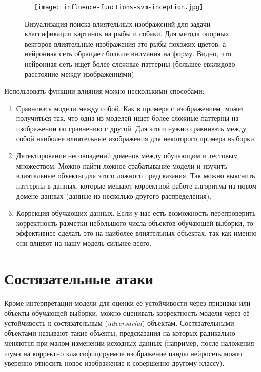 \documentclass[12pt,a4paper]{article}
\begin{document}
\begin{center}
\begin{figure}[!htb]
 \centering
 \texttt{[image: influence-functions-svm-inception.jpg]}
 \caption{Визуализация поиска влиятельных изображений для задачи классификации картинок на рыбы и собаки. Для метода опорных векторов влиятельные изображения это рыбы похожих цветов, а нейронная сеть обращает больше внимания на форму. Видно, что нейронная сеть ищет более сложные паттерны (большее евклидово расстояние между изображениями)}\label{fig:graph}
\end{figure}
\end{center}

Использовать функции влияния можно несколькими способами:
\begin{enumerate}
	\item Сравнивать модели между собой. Как в примере с изображением, может получиться так, что одна из моделей ищет более сложные паттерны на изображении по сравнению с другой. Для этого нужно сравнивать между собой наиболее влиятельные изображения для некоторого примера выборки.
	\item Детектирование несовпадений доменов между обучающим и тестовым множеством. Можно найти ложное срабатывание модели и изучить влиятельные объекты для этого ложного предсказания. Так можно выяснить паттерны в данных, которые мешают корректной работе алгоритма на новом домене данных (данные из несколько другого распределения).
	\item Коррекция обучающих данных. Если у нас есть возможность перепроверить корректность разметки небольшого числа объектов обучающей выборки, то эффективнее сделать это на наиболее влиятельных объектах, так как именно они влияют на нашу модель сильнее всего.
\end{enumerate}


\section{Состязательные атаки}

Кроме интерпретации модели для оценки её устойчивости через признаки или объекты обучающей выборки, можно оценивать корректность модели через её устойчивость к состязательным (\emph{adversarial}) объектам. Состязательными объектами называют такие объекты, предсказания на которых радикально меняются при малом изменении исходных данных (например, после наложения шума на корректно классифицируемое изображение панды нейросеть может уверенно относить новое изображение к совершенно другому классу).
\end{document}
